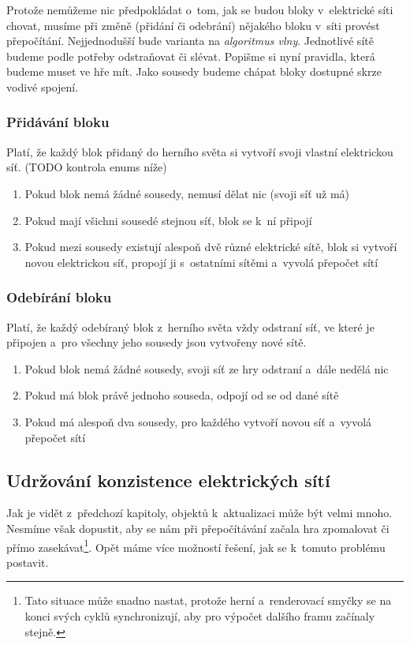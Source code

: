 Protože nemůžeme nic předpokládat o~tom, jak se budou bloky v~elektrické síti chovat, musíme při změně (přidání či odebrání) nějakého bloku v~síti provést přepočítání. Nejjednodušší bude varianta na \textit{algoritmus vlny}. Jednotlivé sítě budeme podle potřeby odstraňovat či slévat. Popišme si nyní pravidla, která budeme muset ve hře mít. Jako sousedy budeme chápat bloky dostupné skrze vodivé spojení.

\subsubsection{Přidávání bloku}
Platí, že každý blok přidaný do herního světa si vytvoří svoji vlastní elektrickou síť.
(TODO kontrola enums níže)
\begin{enumerate}
	\item Pokud blok nemá žádné sousedy, nemusí dělat nic (svoji síť už má)
	\item Pokud mají všichni sousedé stejnou síť, blok se k~ní připojí
	\item Pokud mezi sousedy existují alespoň dvě různé elektrické sítě, blok si vytvoří novou elektrickou síť, propojí ji s~ostatními sítěmi a~vyvolá přepočet sítí
\end{enumerate}

\subsubsection{Odebírání bloku}
Platí, že každý odebíraný blok z~herního světa vždy odstraní síť, ve které je připojen a~pro všechny jeho sousedy jsou vytvořeny nové sítě.

\begin{enumerate}
	\item Pokud blok nemá žádné sousedy, svoji síť ze hry odstraní a~dále nedělá nic
	\item Pokud má blok právě jednoho souseda, odpojí od se od dané sítě
	\item Pokud má alespoň dva sousedy, pro každého vytvoří novou síť a~vyvolá přepočet sítí
\end{enumerate}

\subsection{Udržování konzistence elektrických sítí}

Jak je vidět z~předchozí kapitoly, objektů k~aktualizaci může být velmi mnoho. Nesmíme však dopustit, aby se nám při přepočítávání začala hra zpomalovat či přímo zasekávat\footnote{Tato situace může snadno nastat, protože herní a~renderovací smyčky se na konci svých cyklů synchronizují, aby pro výpočet dalšího framu začínaly stejně.}. Opět máme více možností řešení, jak se k~tomuto problému postavit. 

